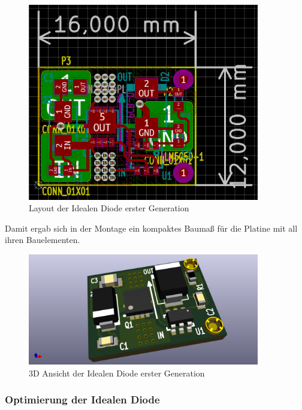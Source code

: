 \begin{figure}[H]
\centering
\includegraphics[width=0.9\textwidth]{bilder/Ideale_Diode/Ideale_Diode_Mini_rev01_ver00.png} 
\caption{Layout der Idealen Diode erster Generation} 
\label{fig:Layout der Idealen Diode erster Generation}
\end{figure}

Damit ergab sich in der Montage ein kompaktes Baumaß für die Platine mit all ihren Bauelementen.

\begin{figure}[H]
\centering
\includegraphics[width=0.9\textwidth]{bilder/Ideale_Diode/Ideale_Diode_Mini_rev01_ver00-3D.png} 
\caption{3D Ansicht der Idealen Diode erster Generation} 
\label{fig:3D Ansicht der Idealen Diode erster Generation}
\end{figure}

\subsubsection{Optimierung der Idealen Diode}

